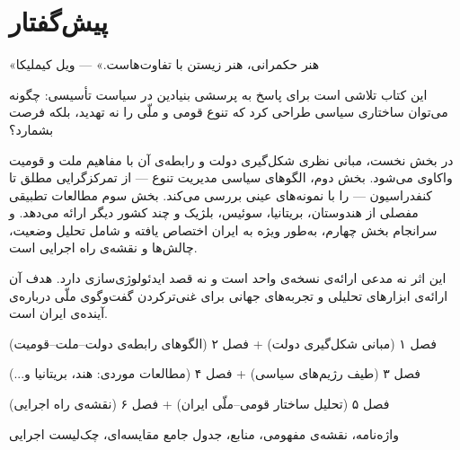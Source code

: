 








\frontmatter
\tableofcontents
\clearpage
\listoffigures
\clearpage
\listoftables

\chapter*{پیش‌گفتار}

\begin{quotebox}
«هنر حکمرانی، هنر زیستن با تفاوت‌هاست.»
\hfill — ویل کیملیکا
\end{quotebox}

\vspace{6pt}

این کتاب تلاشی است برای پاسخ به پرسشی بنیادین در سیاست تأسیسی:
چگونه می‌توان ساختاری سیاسی طراحی کرد که تنوع قومی و ملّی را نه تهدید، بلکه فرصت بشمارد؟

در بخش نخست، مبانی نظری شکل‌گیری دولت و رابطه‌ی آن با مفاهیم ملت و قومیت واکاوی می‌شود.
بخش دوم، الگوهای سیاسی مدیریت تنوع — از تمرکزگرایی مطلق تا کنفدراسیون — را با نمونه‌های
عینی بررسی می‌کند. بخش سوم مطالعات تطبیقی مفصلی از هندوستان، بریتانیا، سوئیس، بلژیک
و چند کشور دیگر ارائه می‌دهد. و سرانجام بخش چهارم، به‌طور ویژه به ایران اختصاص یافته
و شامل تحلیل وضعیت، چالش‌ها و نقشه‌ی راه اجرایی است.

این اثر نه مدعی ارائه‌ی نسخه‌ی واحد است و نه قصد ایدئولوژی‌سازی دارد. هدف آن ارائه‌ی
ابزارهای تحلیلی و تجربه‌های جهانی برای غنی‌ترکردن گفت‌وگوی ملّی درباره‌ی آینده‌ی ایران است.

\simplesep

\begin{keybox}
\begin{description}[style=nextline, leftmargin=2cm]
  \item[\textcolor{PrimaryDark}{بخش اول: مبانی نظری و مفهومی}]
    فصل ۱ (مبانی شکل‌گیری دولت) + فصل ۲ (الگوهای رابطه‌ی دولت–ملت–قومیت)
  \item[\textcolor{PrimaryDark}{بخش دوم: الگوها و مطالعات تطبیقی}]
    فصل ۳ (طیف رژیم‌های سیاسی) + فصل ۴ (مطالعات موردی: هند، بریتانیا و...)
  \item[\textcolor{PrimaryDark}{بخش سوم: ایران — تحلیل و راهبرد}]
    فصل ۵ (تحلیل ساختار قومی–ملّی ایران) + فصل ۶ (نقشه‌ی راه اجرایی)
  \item[\textcolor{PrimaryDark}{پیوست‌ها}]
    واژه‌نامه، نقشه‌ی مفهومی، منابع، جدول جامع مقایسه‌ای، چک‌لیست اجرایی
\end{description}
\end{keybox}


